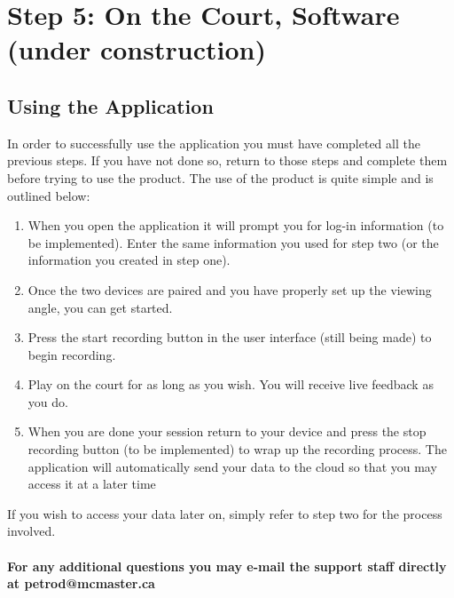 \chapter{Step 5: On the Court, Software (under construction)}

\setlength{\parindent}{0cm}

\section{Using the Application}
In order to successfully use the application you must have completed all the previous steps. If you have not done so, return to those steps and complete them before trying to use the product. The use of the product is quite simple and is outlined below:

\begin{enumerate}[{1)}]
\item When you open the application it will prompt you for log-in information (to be implemented). Enter the same information you used for step two (or the information you created in step one).
\item Once the two devices are paired and you have properly set up the viewing angle, you can get started.
\item Press the start recording button in the user interface (still being made) to begin recording.
\item Play on the court for as long as you wish. You will receive live feedback as you do.
\item When you are done your session return to your device and press the stop recording button (to be implemented) to wrap up the recording process. The application will automatically send your data to the cloud so that you may access it at a later time
\end{enumerate}

If you wish to access your data later on, simply refer to step two for the process involved.\\ \\\textbf{For any additional questions you may e-mail the support staff directly at petrod@mcmaster.ca}
